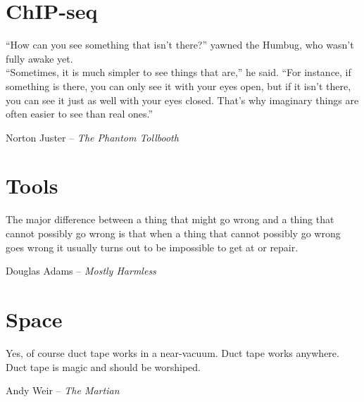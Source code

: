 \documentclass[PhD]{ucdavisthesis}
\begin{document}




\part{ChIP-seq}


\epigraph{``How can you see something that isn't there?'' yawned the Humbug, who wasn't fully awake yet.\\
``Sometimes, it is much simpler to see things that are,'' he said. ``For instance, if something is there, you can only see it with your eyes open, but if it isn't there, you can see it just as well with your eyes closed. That's why imaginary things are often easier to see than real ones.''}{Norton Juster -- {\em The Phantom Tollbooth}}




\part{Tools}

\epigraph{The major difference between a thing that might go wrong and a thing that cannot possibly go wrong is that when a thing that cannot possibly go wrong goes wrong it usually turns out to be impossible to get at or repair.}{Douglas Adams -- {\em Mostly Harmless}}




\part{Space}

\epigraph{Yes, of course duct tape works in a near-vacuum. Duct tape works anywhere. Duct tape is magic and should be worshiped.}{Andy Weir -- {\em The Martian}}



\end{document}
